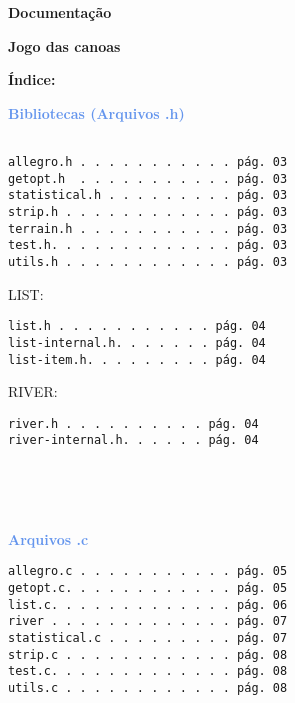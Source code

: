 \documentclass[a4paper,12pt]{article}
\begin{document}
\begin{center} 
  {\Huge \textcolor{NavyBlue}{ \textbf{Documentação}}}
\end{center}

\bigskip
\bigskip
\bigskip



\begin{center} 
  {\Huge \textcolor{NavyBlue}{ \textbf{Jogo das canoas}}}
\end{center}


\newpage %

{\LARGE \textcolor{NavyBlue}{ \textbf{Índice:}}}
\bigskip
\bigskip
\bigskip

{\large \textcolor{CornflowerBlue}{\textbf{Bibliotecas (Arquivos .h)}}}
\begin{verbatim}

allegro.h . . . . . . . . . . . pág. 03
getopt.h  . . . . . . . . . . . pág. 03
statistical.h . . . . . . . . . pág. 03
strip.h . . . . . . . . . . . . pág. 03
terrain.h . . . . . . . . . . . pág. 03
test.h. . . . . . . . . . . . . pág. 03
utils.h . . . . . . . . . . . . pág. 03

\end{verbatim}

{\textcolor{NavyBlue}{ LIST: }}
\begin{verbatim}
list.h . . . . . . . . . . . pág. 04
list-internal.h. . . . . . . pág. 04
list-item.h. . . . . . . . . pág. 04

\end{verbatim}

{\textcolor{NavyBlue}{RIVER:}}
\begin{verbatim}
river.h . . . . . . . . . . pág. 04
river-internal.h. . . . . . pág. 04





\end{verbatim}

{\large \textcolor{CornflowerBlue}{\textbf{Arquivos .c}}}
\begin{verbatim}
allegro.c . . . . . . . . . . . pág. 05
getopt.c. . . . . . . . . . . . pág. 05
list.c. . . . . . . . . . . . . pág. 06
river . . . . . . . . . . . . . pág. 07
statistical.c . . . . . . . . . pág. 07
strip.c . . . . . . . . . . . . pág. 08
test.c. . . . . . . . . . . . . pág. 08
utils.c . . . . . . . . . . . . pág. 08

\end{verbatim}
\end{document}
